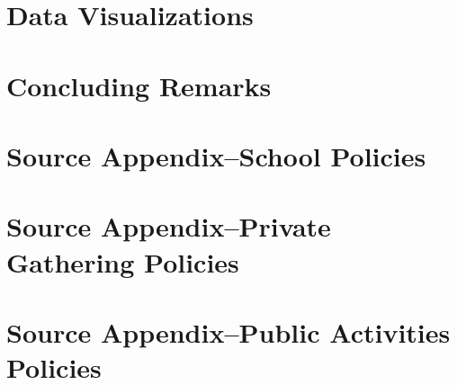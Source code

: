 \documentclass[11pt, a4paper, leqno]{article}
\begin{document}
\section{Data Visualizations} %
\label{sec:section3}




\section{Concluding Remarks} %
\label{sec:conclusion}




\clearpage





\clearpage

\section*{Source Appendix--School Policies} %
\label{sec:source appendix school policies}




\clearpage

\section*{Source Appendix--Private Gathering Policies} %
\label{sec:source appendix private gathering policies}




\clearpage

\section*{Source Appendix--Public Activities Policies} %
\label{sec:source appendix public activities policies}




\clearpage

\printbibliography
{}



\end{document}
